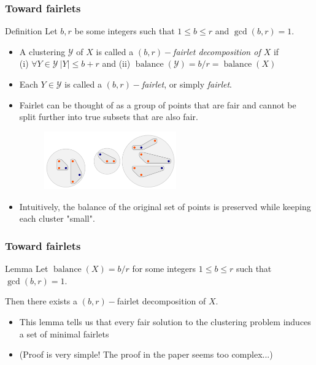 \documentclass{beamer}
\DeclareMathOperator{\balance}{balance}
\begin{document}


\begin{frame}
\frametitle{Toward fairlets }

\begin{alertblock}{Definition}
Let $b, r$ be some integers such that $1 \leq b \leq r$ and $\gcd(b, r) = 1$.

\begin{itemize}
	\item A clustering $\mathcal{Y}$ of $X$ is called a {\it $(b, r)-$fairlet decomposition of $X$} if\\
	(i) $\forall Y \in \mathcal{Y} \ |Y| \leq b + r$ and (ii) $\balance(\mathcal{Y}) = b/r = \balance(X)$
	\item Each $Y \in \mathcal{Y}$ is called a {\it $(b, r)-$fairlet}, or simply {\it fairlet}.
\end{itemize}

\end{alertblock} \pause

\begin{itemize}
	\item Fairlet can be thought of as a group of points that are fair and cannot be split further into true subsets that are also fair.
		\begin{figure}[hbt]
  			\includegraphics[height=2.5cm]{fig2.png}
		\end{figure} \pause
	\item Intuitively, the balance of the original set of points is preserved while keeping each cluster "small".
\end{itemize}

\end{frame}


\begin{frame}
\frametitle{Toward fairlets}

\begin{block}{Lemma}
Let $\balance(X) = b/r$ for some integers $1 \leq b \leq r$ such that $\gcd(b, r) = 1$.

Then there exists a $(b, r)-$fairlet decomposition of $X$.
\end{block} \pause

\begin{itemize}
	\item This lemma tells us that every fair solution to the clustering problem induces a set of minimal fairlets
	\item (Proof is very simple! The proof in the paper seems too complex...)
\end{itemize}

\end{frame}
\end{document}
